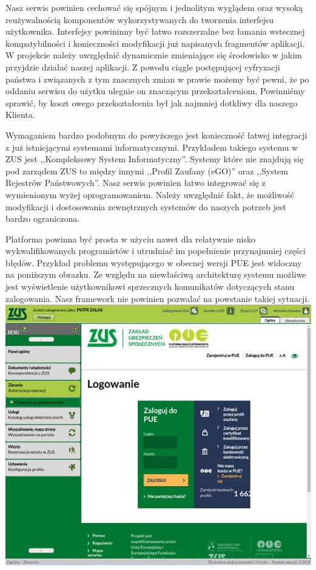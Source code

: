 \documentclass[licencjacka]{pracamgr}
\begin{document}
Nasz serwis powinien cechować się spójnym i jednolitym wyglądem oraz wysoką
reużywalnością komponentów wykorzystywanych do tworzenia interfejsu użytkownika.
Interfejsy powininny być łatwo rozszerzalne bez łamania wstecznej kompatybilności
i konieczności modyfikacji już napisanych fragmentów aplikacji. W projekcie
należy uwzględnić dynamicznie zmieniające się środowisko w jakim przyjdzie działać
naszej aplikacji. Z powodu ciągle postępującej cyfryzacji państwa i związanych z
tym znacznych zmian w prawie możemy być pewni, że po oddaniu serwisu do użytku
ulegnie on znaczącym przekształceniom. Powinniśmy sprawić, by koszt owego przekształcenia
był jak najmniej dotkliwy dla naszego Klienta.

Wymaganiem bardzo podobnym do powyższego jest konieczność łatwej integracji z już
istniejącymi systemami informatycznymi. Przykładem takiego systemu w ZUS jest
,,Kompleksowy System Informatyczny''. Systemy które nie znajdują się pod zarządem ZUS
to między innymi ,,Profil Zaufany (eGO)'' oraz ,,System Rejestrów Państwowych''.
Nasz serwis powinien łatwo integrować się z wymienionym wyżej oprogramowaniem.
Należy uwzględnić fakt, że możliwość modyfikacji i dostosowania zewnętrznych
systemów do naszych potrzeb jest bardzo ograniczona.

Platforma powinna być prosta w użyciu nawet dla relatywnie nisko wykwalifikowanych
programistów i utrudniać im popełnienie przynajmniej części błędów. Przykład
problemu występującego w obecnej wersji PUE jest widoczny na poniższym obrazku.
Ze względu na niewłaściwą architekturę systemu możliwe jest wyświetlenie
użytkownikowi sprzecznych komunikatów dotyczących stanu zalogowania. Nasz framework
nie powinien pozwalać na powstanie takiej sytuacji.\\
\includegraphics[width=\textwidth]{obrazki/logowaniezle.png}
\end{document}
